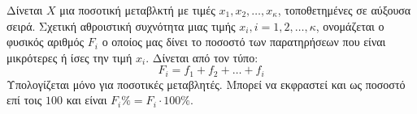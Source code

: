 Δίνεται $ X $ μια ποσοτική μεταβλκτή με τιμές $x_1,x_2,\ldots,x_{\kappa}$, τοποθετημένες σε αύξουσα σειρά. Σχετική αθροιστική συχνότητα μιας τιμής $ x_i,i=1,2,\ldots,\kappa $, ονομάζεται ο φυσικός αριθμός $ F_i $ ο οποίος μας δίνει το ποσοστό των παρατηρήσεων που είναι μικρότερες ή ίσες την τιμή $ x_i $. Δίνεται από τον τύπο:
\[ F_i=f_1+f_2+\ldots+f_i \]
Υπολογίζεται μόνο για ποσοτικές μεταβλητές. Μπορεί να εκφραστεί και ως ποσοστό επί τοις $ 100 $ και είναι $ F_i\%=F_i\cdot 100\% $.
